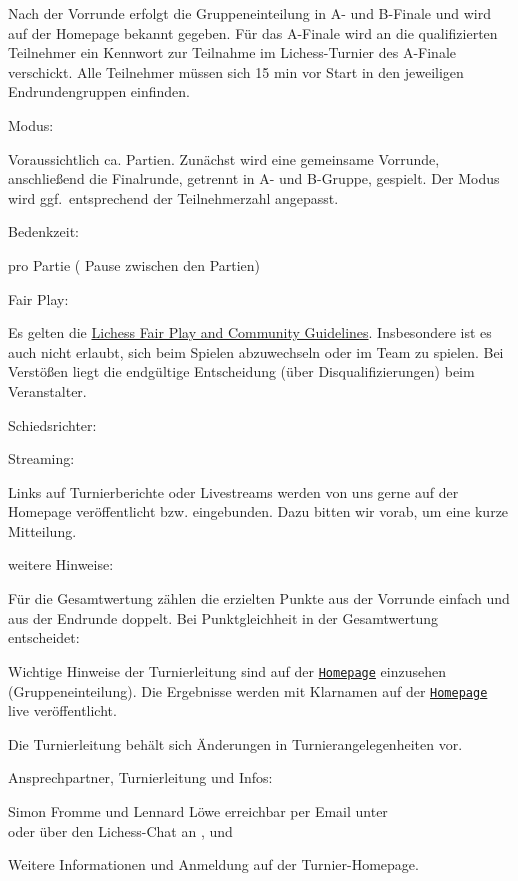\documentclass[paper=a4, fontsize=10pt]{scrartcl}
\begin{document}
\begin{basedescript}{\desclabelstyle{\multilinelabel}\desclabelwidth{10em}}
  Nach der Vorrunde erfolgt die Gruppeneinteilung in A- und B-Finale
  und wird auf der Homepage bekannt gegeben. Für das A-Finale wird an
  die qualifizierten Teilnehmer ein Kennwort zur Teilnahme im
  Lichess-Turnier des A-Finale verschickt. Alle Teilnehmer müssen sich
  15 min vor Start in den jeweiligen Endrundengruppen einfinden.

\item[Modus:]

  Voraussichtlich ca. \expectedTotalGames{} Partien. Zunächst wird
  eine gemeinsame Vorrunde, anschließend die Finalrunde, getrennt in
  A- und B-Gruppe, gespielt. Der Modus wird ggf.\ entsprechend der
  Teilnehmerzahl angepasst.

\item[Bedenkzeit:]

  \timePerGame{} pro Partie (\pauseBetweenGames{} Pause zwischen den
  Partien)

\item[Fair Play:]

  Es gelten die \href{\lichessTermsOfServiceURL}{Lichess Fair Play and
    Community Guidelines}. Insbesondere ist es auch nicht erlaubt,
  sich beim Spielen abzuwechseln oder im Team zu spielen. Bei
  Verstößen liegt die endgültige Entscheidung (über
  Disqualifizierungen) beim Veranstalter.

\item[Schiedsrichter:]

  \arbiter{}

\item[Streaming:]

  Links auf Turnierberichte oder Livestreams werden von uns gerne auf
  der Homepage veröffentlicht bzw. eingebunden. Dazu bitten wir vorab,
  um eine kurze Mitteilung.

\item[weitere Hinweise:]

  Für die Gesamtwertung zählen die erzielten Punkte aus der Vorrunde
  einfach und aus der Endrunde doppelt.  Bei Punktgleichheit in der
  Gesamtwertung entscheidet:

  \enum{\tiebreak}

  Wichtige Hinweise der Turnierleitung sind auf der
  \href{\tournamentURL}{\texttt{Homepage}} einzusehen
  (Gruppeneinteilung). Die Ergebnisse werden mit Klarnamen auf der
  \href{\tournamentURL}{\texttt{Homepage}} live veröffentlicht.

  Die Turnierleitung behält sich Änderungen in Turnierangelegenheiten
  vor.

\item[Ansprechpartner, Turnierleitung und Infos:]

  Simon Fromme und Lennard Löwe erreichbar per Email unter
  \\ \email{\tournamentEmail} oder über den Lichess-Chat an
  ,  und

  Weitere Informationen und Anmeldung auf der Turnier-Homepage.
\end{basedescript}
\end{document}
